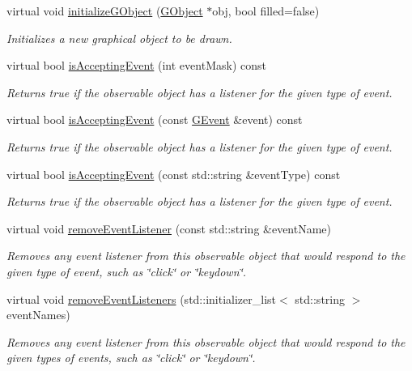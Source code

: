 \begin{DoxyCompactItemize}
virtual void \mbox{\hyperlink{classsgl_1_1GDrawingSurface_a43e6bc951980da061ddc40407daee227}{initialize\+G\+Object}} (\mbox{\hyperlink{classsgl_1_1GObject}{G\+Object}} $\ast$obj, bool filled=false)
\begin{DoxyCompactList}\small\item\em Initializes a new graphical object to be drawn. \end{DoxyCompactList}\item 
virtual bool \mbox{\hyperlink{classsgl_1_1GObservable_aeec1adc19aa0f33de62390686ee1382c}{is\+Accepting\+Event}} (int event\+Mask) const
\begin{DoxyCompactList}\small\item\em Returns true if the observable object has a listener for the given type of event. \end{DoxyCompactList}\item 
virtual bool \mbox{\hyperlink{classsgl_1_1GObservable_aa31c73145a29dcb92848a92e0cfaea41}{is\+Accepting\+Event}} (const \mbox{\hyperlink{classsgl_1_1GEvent}{G\+Event}} \&event) const
\begin{DoxyCompactList}\small\item\em Returns true if the observable object has a listener for the given type of event. \end{DoxyCompactList}\item 
virtual bool \mbox{\hyperlink{classsgl_1_1GObservable_a3b1c689267eda44e65a2213e7de38b23}{is\+Accepting\+Event}} (const std\+::string \&event\+Type) const
\begin{DoxyCompactList}\small\item\em Returns true if the observable object has a listener for the given type of event. \end{DoxyCompactList}\item 
virtual void \mbox{\hyperlink{classsgl_1_1GObservable_acbcf1ed3a851ad8a3c17ef38d86b481d}{remove\+Event\+Listener}} (const std\+::string \&event\+Name)
\begin{DoxyCompactList}\small\item\em Removes any event listener from this observable object that would respond to the given type of event, such as \char`\"{}click\char`\"{} or \char`\"{}keydown\char`\"{}. \end{DoxyCompactList}\item 
virtual void \mbox{\hyperlink{classsgl_1_1GObservable_af51cc35c29a1bd1908609d432decdbb6}{remove\+Event\+Listeners}} (std\+::initializer\+\_\+list$<$ std\+::string $>$ event\+Names)
\begin{DoxyCompactList}\small\item\em Removes any event listener from this observable object that would respond to the given types of events, such as \char`\"{}click\char`\"{} or \char`\"{}keydown\char`\"{}. \end{DoxyCompactList}\item 

\end{DoxyCompactItemize}
